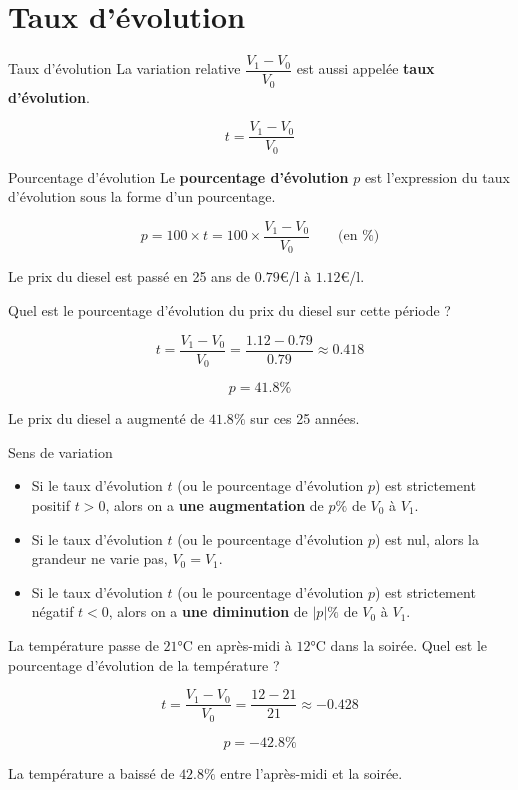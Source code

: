 \documentclass[10pt,a4paper,openany,twoside, prof]{book}
\begin{document}
\section{Taux d'évolution}

\begin{defi}{Taux d'évolution}{}
La variation relative $\dfrac{V_1-V_0}{V_0}$ est aussi appelée \textbf{taux d'évolution}.

\[t = \frac{V_1-V_0}{V_0}\]
\end{defi}

\begin{defi}{Pourcentage d'évolution}{}
	Le \textbf{pourcentage d'évolution} $p$ est l'expression du taux d'évolution sous la forme d'un pourcentage.

	\[p = 100\times t = 100 \times \frac{V_1-V_0}{V_0} \qquad \text{(en \%)}\]
\end{defi}

\begin{ex}{}{}
Le prix du diesel est passé en 25 ans de $0.79$€/l à $1.12$€/l.

\noindent Quel est le pourcentage d'évolution du prix du diesel sur cette période ?

\[t = \frac{V_1-V_0}{V_0} = \frac{1.12 - 0.79}{0.79}\approx 0.418\]

\[p = 41.8\%\]

\noindent Le prix du diesel a augmenté de $41.8\%$ sur ces 25 années.
\end{ex}

\begin{prop}{Sens de variation}{}
\begin{itemize}
\item Si le taux d'évolution $t$ (ou le pourcentage d'évolution $p$) est strictement positif $t > 0$, alors on a \textbf{une augmentation} de $p\%$ de $V_0$ à $V_1$.
\item Si le taux d'évolution $t$ (ou le pourcentage d'évolution $p$) est nul, alors la grandeur ne varie pas, $V_0=V_1$.
\item Si le taux d'évolution $t$ (ou le pourcentage d'évolution $p$) est strictement négatif $t < 0$, alors on a \textbf{une diminution} de $|p|\%$ de $V_0$ à $V_1$.
\end{itemize}
\end{prop}

\begin{ex}{}{}
La température passe de $21$°C en après-midi à $12$°C dans la soirée. Quel est le pourcentage d'évolution de la température ?

\[t = \frac{V_1-V_0}{V_0} = \frac{12 - 21}{21}\approx -0.428 \]

\[p=-42.8\% \]

\noindent La température a baissé de $42.8\%$ entre l'après-midi et la soirée.
\end{ex}
\end{document}

